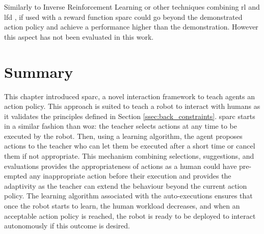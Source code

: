 Similarly to Inverse Reinforcement Learning \citep{abbeel2004apprenticeship} or other techniques combining \gls{rl} and \gls{lfd} \citep{billard2008robot}, if used with a reward function \gls{sparc} could go beyond the demonstrated action policy and achieve a performance higher than the demonstration. However this aspect has not been evaluated in this work.

\section{Summary}
    
This chapter introduced \acrfull{sparc}, a novel interaction framework to teach agents an action policy. This approach is suited to teach a robot to interact with humans as it validates the principles defined in Section \ref{ssec:back_constraints}. \gls{sparc} starts in a similar fashion than \gls{woz}: the teacher selects actions at any time to be executed by the robot. Then, using a learning algorithm, the agent proposes actions to the teacher who can let them be executed after a short time or cancel them if not appropriate. This mechanism combining selections, suggestions, and evaluations provides the appropriateness of actions as a human could have pre-empted any inappropriate action before their execution and provides the adaptivity as the teacher can extend the behaviour beyond the current action policy. The learning algorithm associated with the auto-executions ensures that once the robot starts to learn, the human workload decreases, and when an acceptable action policy is reached, the robot is ready to be deployed to interact autonomously if this outcome is desired.
